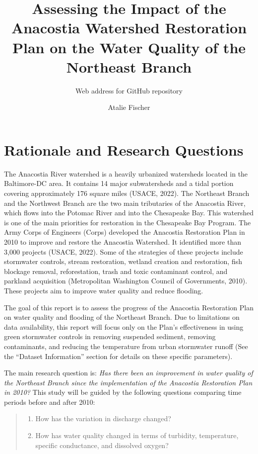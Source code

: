 \documentclass[
  12pt,
]{article}
\title{Assessing the Impact of the Anacostia Watershed Restoration Plan
on the Water Quality of the Northeast Branch}
\subtitle{Web address for GitHub repository}
\author{Atalie Fischer}
\date{}
\providecommand{\tightlist}{%
  \setlength{\itemsep}{0pt}\setlength{\parskip}{0pt}}
\begin{document}
\maketitle

\newpage

\hypertarget{rationale-and-research-questions}{%
\section{Rationale and Research
Questions}\label{rationale-and-research-questions}}

The Anacostia River watershed is a heavily urbanized watersheds located
in the Baltimore-DC area. It contains 14 major subwatersheds and a tidal
portion covering approximately 176 square miles (USACE, 2022). The
Northeast Branch and the Northwest Branch are the two main tributaries
of the Anacostia River, which flows into the Potomac River and into the
Chesapeake Bay. This watershed is one of the main priorities for
restoration in the Chesapeake Bay Program. The Army Corps of Engineers
(Corps) developed the Anacostia Restoration Plan in 2010 to improve and
restore the Anacostia Watershed. It identified more than 3,000 projects
(USACE, 2022). Some of the strategies of these projects include
stormwater controls, stream restoration, wetland creation and
restoration, fish blockage removal, reforestation, trash and toxic
contaminant control, and parkland acquisition (Metropolitan Washington
Council of Governments, 2010). These projects aim to improve water
quality and reduce flooding.

The goal of this report is to assess the progress of the Anacostia
Restoration Plan on water quality and flooding of the Northeast Branch.
Due to limitations on data availability, this report will focus only on
the Plan's effectiveness in using green stormwater controls in removing
suspended sediment, removing contaminants, and reducing the temperature
from urban stormwater runoff (See the ``Dataset Information'' section
for details on these specific parameters).

The main research question is: \emph{Has there been an improvement in
water quality of the Northeast Branch since the implementation of the
Anacostia Restoration Plan in 2010?} This study will be guided by the
following questions comparing time periods before and after 2010:

\begin{quote}
\begin{enumerate}
\def\labelenumi{\arabic{enumi}.}
\tightlist
\item
  How has the variation in discharge changed?
\item
  How has water quality changed in terms of turbidity, temperature,
  specific conductance, and dissolved oxygen?
\end{enumerate}
\end{quote}
\end{document}
